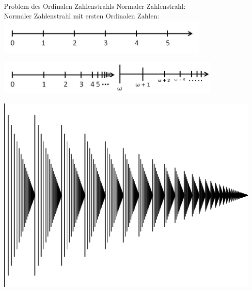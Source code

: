 \begin{frame}[c]{Problem des Ordinalen Zahlenstrahls}
    \large
     {Normaler Zahlenstrahl: \\}
     {Normaler Zahlenstrahl mit ersten Ordinalen Zahlen:\\}
    \Huge
     {
        \includegraphics[width=0.8\textwidth]{proseminar/images/zahlenstrahl.jpeg}
    }

     {
        \includegraphics[width=0.85\textwidth]{proseminar/images/zahlenstrahl_ordinal.jpeg}
    }

     {
        \includegraphics[width=\textwidth]{proseminar/images/ordinal-omega-squared}
    }


\end{frame}
